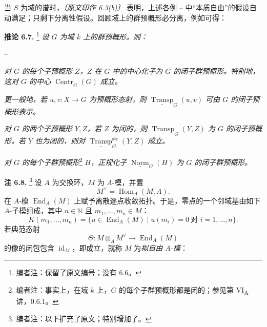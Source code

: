 当 \(S\) 为域的谱时，\emph{〔原文印作 6.3(b)〕} 表明，上述各例 -- 中“本质自由”的假设自动满足；只剩下分离性假设。回顾域上的群预概形必分离，例如可得：

\medskip
\noindent{}\textbf{推论 6.7.}
\footnote{编者注：保留了原文编号；没有 6.6。}
\textit{设 \(G\) 为域 \(k\) 上的群预概形。则：}
\begin{list}{--}{\setlength{\leftmargin}{1.8em}\setlength{\itemsep}{0.35em}}
  \item{}
  \textit{对 \(G\) 的每个子预概形 \(Z\)，\(Z\) 在 \(G\) 中的中心化子为 \(G\) 的闭子群预概形。特别地，这对 \(G\) 的中心 \(\underline{\operatorname{Centr}}_G(G)\) 成立。}

  \item{}
  \textit{更一般地，若 \(u,v:X\to G\) 为预概形态射，则 \(\underline{\operatorname{Transp}}_G(u,v)\) 可由 \(G\) 的闭子预概形表示。}

  \item{}
  \textit{对 \(G\) 的两个子预概形 \(Y,Z\)，若 \(Z\) 为闭的，则 \(\underline{\operatorname{Transp}}_G(Y,Z)\) 为 \(G\) 的闭子预概形。若 \(Y\) 也为闭的，则对 \(\underline{\operatorname{Transp}}^{\mathrm{str}}_G(Y,Z)\) 成立。}

  \item{}
  \textit{对 \(G\) 的每个子群预概形}\footnote{编者注：事实上，在域 \(k\) 上，\(G\) 的每个子群预概形都是闭的；参见第 VI\textsubscript{A} 讲，0.6.1。}
  \textit{\(H\)，正规化子 \(\underline{\operatorname{Norm}}_G(H)\) 为 \(G\) 的闭子群预概形。}
\end{list}

\medskip
\noindent{}\textbf{注 6.8.}
\footnote{编者注：以下扩充了原文；特别增加了。}
设 \(A\) 为交换环，\(M\) 为 \(A\)-模，并置
\[
  M^\vee=\operatorname{Hom}_A(M,A).
\]
在 \(A\)-模 \(\operatorname{End}_A(M)\) 上赋予离散逐点收敛拓扑。于是，零点的一个邻域基由如下 \(A\)-子模组成，其中 \(n\in\mathbb N\) 且 \(m_1,\ldots,m_n\in M\)：
\[
  K(m_1,\ldots,m_n)
  =
  \{u\in\operatorname{End}_A(M)\mid
  u(m_i)=0\ \text{对 \(i=1,\ldots,n\)}\}.
\]
若典范态射
\[
  \Theta:M\otimes_AM^\vee\longrightarrow\operatorname{End}_A(M)
\]
的像的闭包包含 \(\operatorname{id}_M\)，即成立，就称 \(M\) 为\emph{拟自由 \(A\)-模}：

